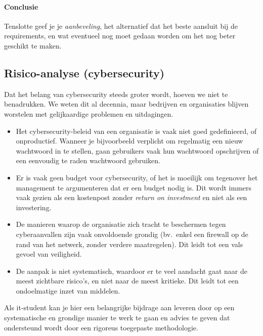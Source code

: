 \paragraph{Conclusie}%

Tenslotte geef je je \emph{aanbeveling}, het alternatief dat het beste aansluit bij de requirements, en wat eventueel nog moet gedaan worden om het nog beter geschikt te maken.

\subsection{Risico-analyse (cybersecurity)}%
\label{ssec:risico-analyse}

Dat het belang van cybersecurity steeds groter wordt, hoeven we niet te benadrukken. We weten dit al decennia, maar bedrijven en organisaties blijven worstelen met gelijkaardige problemen en uitdagingen.

\begin{itemize}
  \item Het cybersecurity-beleid van een organisatie is vaak niet goed gedefinieerd, of onproductief. Wanneer je bijvoorbeeld verplicht om regelmatig een nieuw wachtwoord in te stellen, gaan gebruikers vaak hun wachtwoord opschrijven of een eenvoudig te raden wachtwoord gebruiken.

  \item Er is vaak geen budget voor cybersecurity, of het is moeilijk om tegenover het management te argumenteren dat er een budget nodig is. Dit wordt immers vaak gezien als een kostenpost zonder \emph{return on investment} en niet als een investering.

  \item De manieren waarop de organisatie zich tracht te beschermen tegen cyberaanvallen zijn vaak onvoldoende grondig (bv.~enkel een firewall op de rand van het netwerk, zonder verdere maatregelen). Dit leidt tot een vals gevoel van veiligheid.

  \item De aanpak is niet systematisch, waardoor er te veel aandacht gaat naar de meest zichtbare risico's, en niet naar de meest kritieke. Dit leidt tot een ondoelmatige inzet van middelen.
\end{itemize}

Als it-student kan je hier een belangrijke bijdrage aan leveren door op een systematische en grondige manier te werk te gaan en advies te geven dat ondersteund wordt door een rigoreus toegepaste methodologie.

